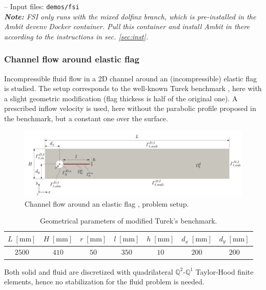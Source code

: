 \documentclass[a4paper,12pt]{report}
\begin{document}
-- Input files: \verb"demos/fsi"\\

\textit{\textbf{Note:} FSI only runs with the mixed dolfinx branch, which is pre-installed in the Ambit devenv Docker container. Pull this container and install Ambit in there according to the instructions in sec. \ref{sec:inst}.}

\subsubsection*{Channel flow around elastic flag}

Incompressible fluid flow in a 2D channel around an (incompressible) elastic flag is studied. The setup corresponds to the well-known Turek benchmark \cite{turek2006}, here with a slight geometric modification (flag thickess is half of the original one). A prescribed inflow velocity is used, here without the parabolic profile proposed in the benchmark, but a constant one over the surface.\\

\begin{figure}
\centering
\includegraphics[width=1.0\textwidth]{fig/channel_flag_setup.png}
\caption{Channel flow around an elastic flag \cite{turek2006}, problem setup.}
\label{fig:channel_flag_setup}
\end{figure}

\begin{table}[!h]
\begin{center}
\caption{Geometrical parameters of modified Turek's benchmark.}\label{tab:params_geo_turek}
\begin{tabular}{ccccccc}
$L\;[\mathrm{mm}]$ & $H\;[\mathrm{mm}]$ & $r\;[\mathrm{mm}]$ & $l\;[\mathrm{mm}]$ & $h\;[\mathrm{mm}]$ & $d_x\;[\mathrm{mm}]$ & $d_y\;[\mathrm{mm}]$ \\\hline
$2500$ & $410$ & $50$ & $350$ & $10$ & $200$ & $200$
\end{tabular}
\end{center}
\end{table}

Both solid and fluid are discretized with quadrilateral $\mathbb{Q}^2$-$\mathbb{Q}^1$ Taylor-Hood finite elements, hence no stabilization for the fluid problem is needed.\\
\end{document}
